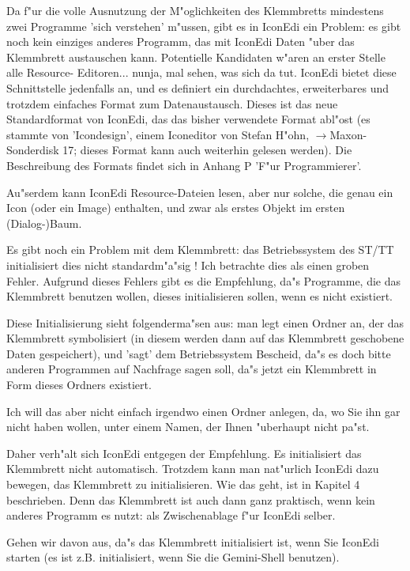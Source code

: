 Da f"ur die volle Ausnutzung der M"oglichkeiten des Klemmbretts 
mindestens zwei Programme 'sich verstehen' m"ussen, gibt es in 
IconEdi ein Problem: es gibt noch kein einziges anderes Programm, 
das mit IconEdi Daten "uber das Klemmbrett austauschen kann. 
Potentielle Kandidaten w"aren an erster Stelle alle Resource-
Editoren... nunja, mal sehen, was sich da tut. IconEdi bietet 
diese Schnittstelle jedenfalls an, und es definiert ein 
durchdachtes, erweiterbares und trotzdem einfaches Format zum 
Datenaustausch. Dieses ist das neue Standardformat von IconEdi, 
das das bisher verwendete Format abl"ost (es stammte von 
'Icondesign', einem Iconeditor von Stefan H"ohn, 
$\to$Maxon-Sonderdisk 17; dieses Format kann auch weiterhin 
gelesen werden). Die Beschreibung des Formats findet sich in 
Anhang P 'F"ur Programmierer'.

Au"serdem kann IconEdi Resource-Dateien lesen, aber nur solche, 
die genau ein Icon (oder ein Image) enthalten, und zwar als 
erstes Objekt im ersten (Dialog-)Baum. 

Es gibt noch ein Problem mit dem Klemmbrett: das Betriebssystem 
des ST/TT initialisiert dies nicht standardm"a"sig ! Ich betrachte 
dies als einen groben Fehler. Aufgrund dieses Fehlers gibt es die 
Empfehlung, da"s Programme, die das Klemmbrett benutzen wollen, 
dieses initialisieren sollen, wenn es nicht existiert.

Diese Initialisierung sieht folgenderma"sen aus: man legt einen 
Ordner an, der das Klemmbrett symbolisiert (in diesem werden dann 
auf das Klemmbrett geschobene Daten gespeichert), und 'sagt' dem 
Betriebssystem Bescheid, da"s es doch bitte anderen Programmen auf
Nachfrage sagen soll, da"s jetzt ein Klemmbrett in Form dieses 
Ordners existiert.

Ich will das aber nicht einfach irgendwo einen Ordner anlegen,
da, wo Sie ihn gar nicht haben wollen, unter einem Namen, der
Ihnen "uberhaupt nicht pa"st.

Daher verh"alt sich IconEdi entgegen der Empfehlung. Es 
initialisiert das Klemmbrett nicht automatisch. Trotzdem kann man 
nat"urlich IconEdi dazu bewegen, das Klemmbrett zu initialisieren. 
Wie das geht, ist in Kapitel 4 beschrieben. Denn das Klemmbrett ist 
auch dann ganz praktisch, wenn kein anderes Programm es nutzt: als 
Zwischenablage f"ur IconEdi selber.

Gehen wir davon aus, da"s das Klemmbrett initialisiert ist, wenn Sie
IconEdi starten (es ist z.B. initialisiert, wenn Sie die 
Gemini-Shell benutzen).

